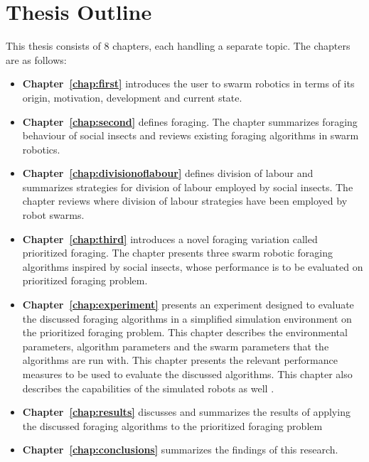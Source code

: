
\section{Thesis Outline}
\label{sec:introduction:outline}
This thesis consists of 8 chapters, each handling a separate topic. The chapters are as follows:

\begin{itemize}
\item\textbf{Chapter~\ref{chap:first}} introduces the user to swarm robotics in terms of its origin, motivation, development and current state.

\item\textbf{Chapter~\ref{chap:second}} defines foraging. The chapter summarizes foraging behaviour of social insects and reviews existing foraging algorithms in swarm robotics.

\item\textbf{Chapter~\ref{chap:divisionoflabour}} defines division of labour and summarizes strategies for division of labour employed by social insects. The chapter reviews where division of labour strategies have been employed by robot swarms.

\item\textbf{Chapter~\ref{chap:third}} introduces a novel foraging variation called prioritized foraging. The chapter presents three swarm robotic foraging algorithms inspired by social insects, whose performance is to be evaluated on prioritized foraging problem.

\item\textbf{Chapter~\ref{chap:experiment}} presents an experiment designed to evaluate the discussed foraging algorithms in a simplified simulation environment on the prioritized foraging problem. This chapter describes the environmental parameters, algorithm parameters and the swarm parameters that the algorithms are run with. This chapter presents the relevant performance measures to be used to evaluate the discussed algorithms. This chapter also describes the capabilities of the simulated robots as well .

\item\textbf{Chapter~\ref{chap:results}} discusses and summarizes the results of applying the discussed foraging algorithms to the prioritized foraging problem

\item\textbf{Chapter~\ref{chap:conclusions}} summarizes the findings of this research.

\end{itemize}

